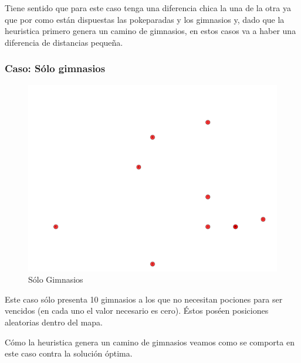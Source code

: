 Tiene sentido que para este caso tenga una diferencia chica la una de la otra ya que por como están dispuestas las pokeparadas y los gimnasios y, dado que la heuristica primero genera un camino de gimnasios, en estos casos va a haber una diferencia de distancias pequeña.


\subsubsection{Caso: Sólo gimnasios}

\begin{figure}[H]
  \begin{center}
    \includegraphics[scale=0.4]{imagenes/test3.pdf}
    \caption{Sólo Gimnasios}
    \label{fig:ej2_caso3}
  \end{center}
\end{figure}

Este caso sólo presenta 10 gimnasios a los que no necesitan pociones para ser vencidos (en cada uno el valor necesario es cero). Éstos poséen posiciones aleatorias dentro del mapa.

Cómo la heuristica genera un camino de gimnasios veamos como se comporta en este caso contra la solución óptima.

